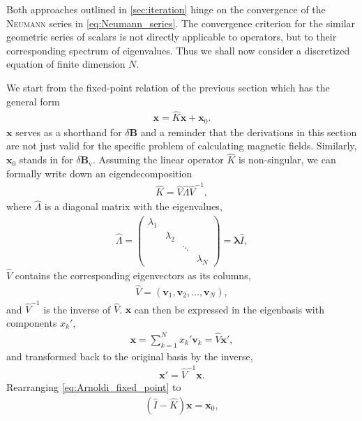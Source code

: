 \documentclass[a4paper, twoside, 10pt, english]{article}
\numberwithin{equation}{section}
\let\vec\symbf
\newcommand*\Bvac{\ensuremath{\delta \vec{B}_{\text{v}}}}  %
\newcommand*\Bpert{\ensuremath{\delta \vec{B}}}  %
\begin{document}
Both approaches outlined in \cref{sec:iteration} hinge on the convergence of the \textsc{Neumann} series in \cref{eq:Neumann_series}. The convergence criterion for the similar geometric series of scalars is not directly applicable to operators, but to their corresponding spectrum of eigenvalues. Thus we shall now consider a discretized equation of finite dimension $N$.

We start from the fixed-point relation of the previous section which has the general form
\begin{gather}
  \vec{x} = \hat{K} \vec{x} + \vec{x}_{0}. \label{eq:Arnoldi_fixed_point}
\end{gather}
$\vec{x}$ serves as a shorthand for $\Bpert$ and a reminder that the derivations in this section are not just valid for the specific problem of calculating magnetic fields. Similarly, $\vec{x}_{0}$ stands in for $\Bvac$.  Assuming the linear operator $\hat{K}$ is non-singular, we can formally write down an eigendecomposition
\begin{gather}
  \hat{K} = \hat{V} \hat{\Lambda} \hat{V}^{-1},
\end{gather}
where $\hat{\Lambda}$ is a diagonal matrix with the eigenvalues,
\begin{gather}
  \hat{\Lambda} = \begin{pmatrix}
    \lambda_{1} & & & \\
    & \lambda_{2} & & \\
    & & \ddots & \\
    & & & \lambda_{N}
  \end{pmatrix} = \vec{\lambda} \hat{I},
\end{gather}
$\hat{V}$ contains the corresponding eigenvectors as its columns,
\begin{gather}
  \hat{V} = \left ( \vec{v}_{1}, \vec{v}_{2}, \dotsc, \vec{v}_{N} \right ),
\end{gather}
and $\hat{V}^{-1}$ is the inverse of $\hat{V}$. $\vec{x}$ can then be expressed in the eigenbasis with components $x_{k}'$,
\begin{gather}
  \vec{x} = \sum_{k = 1}^{N} x_{k}' \vec{v}_{k} = \hat{V} \vec{x}',
\end{gather}
and transformed back to the original basis by the inverse,
\begin{gather}
  \vec{x}' = \hat{V}^{-1} \vec{x}.
\end{gather}
Rearranging \cref{eq:Arnoldi_fixed_point} to
\begin{gather}
  \left ( \hat{I} - \hat{K} \right ) \vec{x} = \vec{x}_{0}, \label{eq:Arnoldi_direct}
\end{gather}
\end{document}
